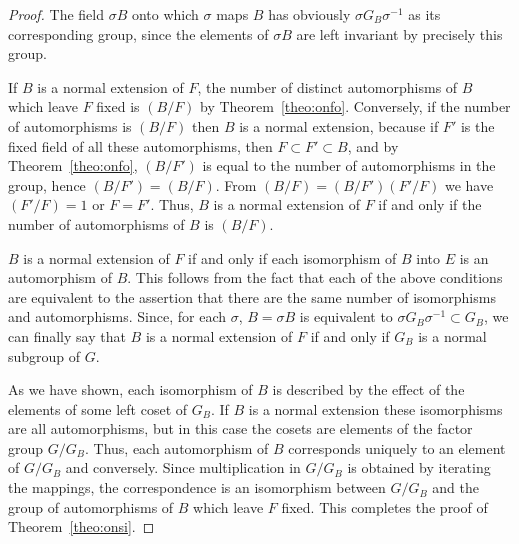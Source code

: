 \documentclass[11pt]{article}
\theoremstyle{definition}
\begin{document}
\begin{proof}
The field $\sigma B$ onto which $\sigma$ maps $B$ has obviously $\sigma G_B \sigma^{-1}$ as its corresponding group, since the elements of $\sigma B$ are left invariant by precisely this group.

If $B$ is a normal extension of $F$, the number of distinct automorphisms of $B$ which leave $F$ fixed is $(B/F)$ by Theorem~\ref{theo:onfo}.
Conversely, if the number of automorphisms is $(B/F)$ then $B$ is a normal extension, because if $F'$ is the fixed field of all these automorphisms, then $F \subset F' \subset B$, and by Theorem~\ref{theo:onfo}, $(B/F')$ is equal to the number of automorphisms in the group, hence $(B/F') = (B/F)$.
From $(B/F) = (B/F') (F'/F)$ we have $(F'/F) = 1$ or $F = F'$.
Thus, $B$ is a normal extension of $F$ if and only if the number of automorphisms of $B$ is $(B/F)$.

$B$ is a normal extension of $F$ if and only if each isomorphism of $B$ into $E$ is an automorphism of $B$.
This follows from the fact that each of the above conditions are equivalent to the assertion that there are the same number of isomorphisms and automorphisms.
Since, for each $\sigma$, $B = \sigma B$ is equivalent to $\sigma G_B \sigma^{-1} \subset G_B$, we can finally say that $B$ is a normal extension of $F$ if and only if $G_B$ is a normal subgroup of $G$.

As we have shown, each isomorphism of $B$ is described by the effect of the elements of some left coset of $G_B$.
If $B$ is a normal extension these isomorphisms are all automorphisms, but in this case the cosets are elements of the factor group $G/G_B$.
Thus, each automorphism of $B$ corresponds uniquely to an element of $G/G_B$ and conversely.
Since multiplication in $G/G_B$ is obtained by iterating the mappings, the correspondence is an isomorphism between $G/G_B$ and the group of automorphisms of $B$ which leave $F$ fixed.
This completes the proof of Theorem~\ref{theo:onsi}.
\end{proof}
\end{document}
